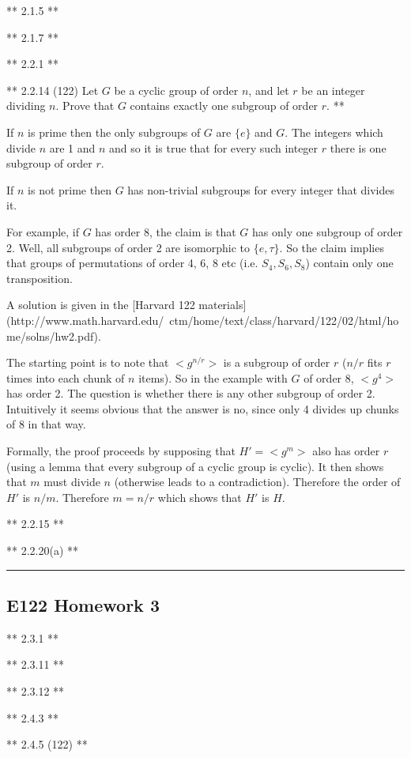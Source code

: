 ** 2.1.5 **

** 2.1.7 **

** 2.2.1 **

** 2.2.14 (122) Let $G$ be a cyclic group of order $n$, and let $r$ be an integer
dividing $n$. Prove that $G$ contains exactly one subgroup of order $r$. **

If $n$ is prime then the only subgroups of $G$ are $\{e\}$ and $G$. The
integers which divide $n$ are 1 and $n$ and so it is true that for every such
integer $r$ there is one subgroup of order $r$.

If $n$ is not prime then $G$ has non-trivial subgroups for every integer that
divides it.

For example, if $G$ has order 8, the claim is that $G$ has only one subgroup of
order 2. Well, all subgroups of order 2 are isomorphic to $\{e, \tau\}$. So the
claim implies that groups of permutations of order 4, 6, 8 etc (i.e. $S_4, S_6,
S_8$) contain only one transposition.


A solution is given in the
[Harvard 122 materials](http://www.math.harvard.edu/~ctm/home/text/class/harvard/122/02/html/home/solns/hw2.pdf).

The starting point is to note that $<g^{n/r}>$ is a subgroup of order $r$
($n/r$ fits $r$ times into each chunk of $n$ items). So in the example with $G$
of order 8, $<g^{4}>$ has order 2. The question is whether there is any other
subgroup of order 2. Intuitively it seems obvious that the answer is no, since
only 4 divides up chunks of 8 in that way.

Formally, the proof proceeds by supposing that $H' = <g^m>$ also has order $r$
(using a lemma that every subgroup of a cyclic group is cyclic). It then shows
that $m$ must divide $n$ (otherwise leads to a contradiction). Therefore the
order of $H'$ is $n/m$. Therefore $m = n/r$ which shows that $H'$ is $H$.

** 2.2.15 **

** 2.2.20(a) **


\hrule

\subsection{E122 Homework 3}

** 2.3.1 **

** 2.3.11 **

** 2.3.12 **

** 2.4.3 **

** 2.4.5 (122) **

